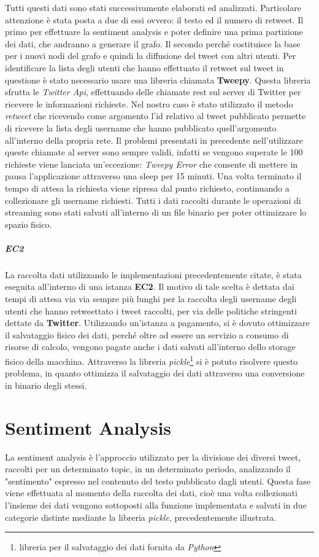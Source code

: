 Tutti questi dati sono stati successivamente elaborati ed analizzati. Particolare attenzione è stata posta a due di essi ovvero: il testo ed il numero di retweet. 
Il primo per effettuare la sentiment analysis e poter definire una prima partizione dei dati, che andranno a generare il grafo.
Il secondo perché costituisce la base per i nuovi nodi del grafo e quindi la diffusione del tweet con altri utenti. 
Per identificare la lista degli utenti che hanno effettuato il retweet sul tweet in questione è stato necessario usare una libreria chiamata \textbf{Tweepy}.
Questa libreria sfrutta le \textit{Twitter Api}, effettuando delle chiamate rest sul server di Twitter per ricevere le informazioni richieste. Nel nostro caso è stato utilizzato il metodo \textit{retweet} che ricevendo come argomento l'id relativo al tweet pubblicato permette di ricevere la lista degli username che hanno pubblicato quell'argomento all'interno della propria rete. Il problemi presentati in precedente nell'utilizzare queste chiamate al server sono sempre validi, infatti se vengono superate le 100 richieste viene lanciata un'eccezione: \textit{Tweepy Error} che consente di mettere in pausa l'applicazione attraverso una sleep per 15 minuti. Una volta terminato il tempo di attesa la richiesta viene ripresa dal punto richiesto, continuando a collezionare gli username richiesti.
Tutti i dati raccolti durante le operazioni di streaming sono stati salvati all'interno di un file binario per poter ottimizzare lo spazio fisico.

\subparagraph{EC2}
La raccolta dati utilizzando le implementazioni precedentemente citate, è stata eseguita all'interno di una istanza \textbf{EC2}. 
Il motivo di tale scelta è dettata dai tempi di attesa via via sempre più lunghi per la raccolta degli username degli utenti che hanno retweettato i tweet raccolti, per via delle politiche stringenti dettate da \textbf{Twitter}.  Utilizzando un'istanza a pagamento, si è dovuto ottimizzare il salvataggio fisico dei dati, perché oltre ad essere un servizio a consumo di risorse di calcolo, vengono pagate anche i dati salvati all'interno dello storage fisico della macchina. Attraverso la libreria \textit{pickle}\footnote{libreria per il salvataggio dei dati fornita da \textit{Python}} si è potuto risolvere questo problema, in quanto ottimizza il salvataggio dei dati attraverso una conversione in binario degli stessi.


\section{Sentiment Analysis}
\label{Sentiment}
La sentiment analysis è l'approccio utilizzato per la divisione dei diversi tweet, raccolti per un determinato topic, in un determinato periodo, analizzando il "sentimento" espresso nel contenuto del testo pubblicato dagli utenti.
Questa fase viene effettuata al momento della raccolta dei dati, cioè una volta collezionati l'insieme dei dati vengono sottoposti alla funzione implementata e salvati in due categorie distinte mediante la libreria \textit{pickle}, precedentemente illustrata.

